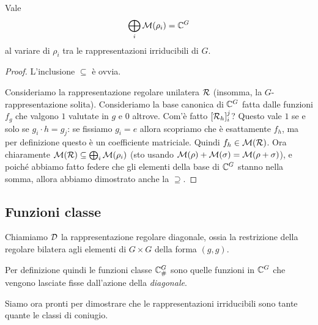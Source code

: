 	\begin{myprop}\label{prop:MatElDirSum}
		Vale
		\[
			\bigoplus_i \mathcal M(\rho_i) = \mathbb C^{G}
		\]
		al variare di $\rho_i$ tra le rappresentazioni irriducibili di $G$.
	\end{myprop}
	\begin{proof}
		L'inclusione $\subseteq$ è ovvia.
		
		Consideriamo la rappresentazione regolare unilatera $\mathcal R$ (insomma, la $G$-rappresentazione solita). Consideriamo la base canonica di $\mathbb C^{G}$ fatta dalle funzioni $f_g$ che valgono $1$ valutate in $g$ e $0$ altrove. Com'è fatto $[\mathcal R_h]_i^j$? Questo vale $1$ se e solo se $g_i\cdot h = g_j$: se fissiamo $g_i=e$ allora scopriamo che è esattamente $f_h$, ma per definizione questo è un coefficiente matriciale. Quindi $f_h\in \mathcal M(\mathcal R)$. Ora chiaramente $\mathcal M(\mathcal R) \subseteq \bigoplus_i \mathcal M(\rho_i)$ (sto usando $\mathcal M(\rho)+\mathcal M(\sigma)=\mathcal M(\rho+\sigma)$), e poiché abbiamo fatto federe che gli elementi della base di $\mathbb C^{G}$ stanno nella somma, allora abbiamo dimostrato anche la $\supseteq$.
	\end{proof}
	
	\subsection{Funzioni classe}
		\begin{mydef}
			Chiamiamo $\mathcal D$ la rappresentazione regolare diagonale, ossia la restrizione della regolare bilatera agli elementi di $G\times G$ della forma $(g,g)$.
		\end{mydef}
		Per definizione quindi le funzioni classe $\mathbb C^{G}_\#$ sono quelle funzioni in $\mathbb C^{G}$ che vengono lasciate fisse dall'azione della \emph{diagonale}. 
		
		Siamo ora pronti per dimostrare che le rappresentazioni irriducibili sono tante quante le classi di coniugio.
		
